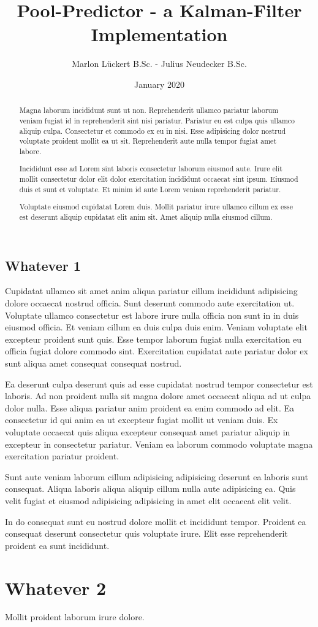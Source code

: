 \documentclass[notitlepage, a4paper, 11pt]{scrartcl}
\begin{document}
\title{Pool-Predictor - a Kalman-Filter Implementation}
\author{Marlon Lückert B.Sc. - Julius Neudecker B.Sc.}
\date{January 2020}

\maketitle

\begin{abstract}
Magna laborum incididunt sunt ut non. Reprehenderit ullamco pariatur laborum veniam fugiat id in reprehenderit sint nisi pariatur. Pariatur eu est culpa quis ullamco aliquip culpa. Consectetur et commodo ex eu in nisi. Esse adipisicing dolor nostrud voluptate proident mollit ea ut sit. Reprehenderit aute nulla tempor fugiat amet labore.

Incididunt esse ad Lorem sint laboris consectetur laborum eiusmod aute. Irure elit mollit consectetur dolor elit dolor exercitation incididunt occaecat sint ipsum. Eiusmod duis et sunt et voluptate. Et minim id aute Lorem veniam reprehenderit pariatur.

Voluptate eiusmod cupidatat Lorem duis. Mollit pariatur irure ullamco cillum ex esse est deserunt aliquip cupidatat elit anim sit. Amet aliquip nulla eiusmod cillum.
\end{abstract}

\begin{multicols}{2}
\section{Whatever 1}

Cupidatat ullamco sit amet anim aliqua pariatur cillum incididunt adipisicing dolore occaecat nostrud officia. Sunt deserunt commodo aute exercitation ut. Voluptate ullamco consectetur est labore irure nulla officia non sunt in in duis eiusmod officia. Et veniam cillum ea duis culpa duis enim. Veniam voluptate elit excepteur proident sunt quis. Esse tempor laborum fugiat nulla exercitation eu officia fugiat dolore commodo sint. Exercitation cupidatat aute pariatur dolor ex sunt aliqua amet consequat consequat nostrud.

Ea deserunt culpa deserunt quis ad esse cupidatat nostrud tempor consectetur est laboris. Ad non proident nulla sit magna dolore amet occaecat aliqua ad ut culpa dolor nulla. Esse aliqua pariatur anim proident ea enim commodo ad elit. Ea consectetur id qui anim ea ut excepteur fugiat mollit ut veniam duis. Ex voluptate occaecat quis aliqua excepteur consequat amet pariatur aliquip in excepteur in consectetur pariatur. Veniam ea laborum commodo voluptate magna exercitation pariatur proident.

Sunt aute veniam laborum cillum adipisicing adipisicing deserunt ea laboris sunt consequat. Aliqua laboris aliqua aliquip cillum nulla aute adipisicing ea. Quis velit fugiat et eiusmod adipisicing adipisicing in amet elit occaecat elit velit.

In do consequat sunt eu nostrud dolore mollit et incididunt tempor. Proident ea consequat deserunt consectetur quis voluptate irure. Elit esse reprehenderit proident ea sunt incididunt.

\end{multicols}


\section{Whatever 2}

Mollit proident laborum irure dolore.
\end{document}
